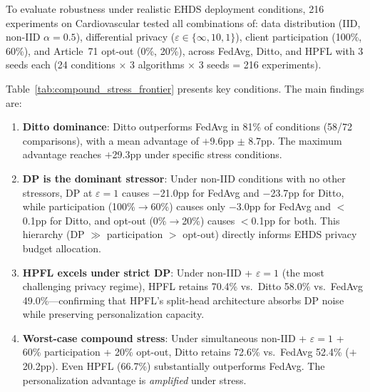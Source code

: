 \documentclass[conference]{IEEEtran}
\begin{document}
To evaluate robustness under realistic EHDS deployment conditions, 216 experiments on Cardiovascular tested all combinations of: data distribution (IID, non-IID $\alpha{=}0.5$), differential privacy ($\varepsilon \in \{\infty, 10, 1\}$), client participation (100\%, 60\%), and Article~71 opt-out (0\%, 20\%), across FedAvg, Ditto, and HPFL with 3 seeds each (24 conditions $\times$ 3 algorithms $\times$ 3 seeds = 216 experiments).

Table~\ref{tab:compound_stress_frontier} presents key conditions. The main findings are:

\begin{enumerate}
    \item \textbf{Ditto dominance}: Ditto outperforms FedAvg in 81\% of conditions (58/72 comparisons), with a mean advantage of $+$9.6pp $\pm$ 8.7pp. The maximum advantage reaches $+$29.3pp under specific stress conditions.

    \item \textbf{DP is the dominant stressor}: Under non-IID conditions with no other stressors, DP at $\varepsilon{=}1$ causes $-$21.0pp for FedAvg and $-$23.7pp for Ditto, while participation (100\%$\to$60\%) causes only $-$3.0pp for FedAvg and $<$0.1pp for Ditto, and opt-out (0\%$\to$20\%) causes $<$0.1pp for both. This hierarchy (DP $\gg$ participation $>$ opt-out) directly informs EHDS privacy budget allocation.

    \item \textbf{HPFL excels under strict DP}: Under non-IID + $\varepsilon{=}1$ (the most challenging privacy regime), HPFL retains 70.4\% vs.\ Ditto 58.0\% vs.\ FedAvg 49.0\%---confirming that HPFL's split-head architecture absorbs DP noise while preserving personalization capacity.

    \item \textbf{Worst-case compound stress}: Under simultaneous non-IID + $\varepsilon{=}1$ + 60\% participation + 20\% opt-out, Ditto retains 72.6\% vs.\ FedAvg 52.4\% ($+$20.2pp). Even HPFL (66.7\%) substantially outperforms FedAvg. The personalization advantage is \textit{amplified} under stress.
\end{enumerate}
\end{document}
